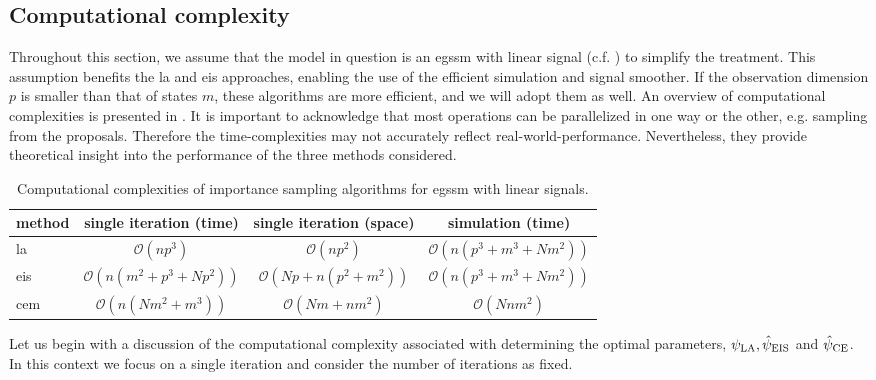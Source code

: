 \subsection{Computational complexity}
Throughout this section, we assume that the model in question is an \gls{egssm} with linear signal (c.f. ) to simplify the treatment. This assumption benefits the \gls{la} and \gls{eis} approaches, enabling the use of the efficient simulation and signal smoother. If the observation dimension $p$ is smaller than that of states $m$, these algorithms are more efficient, and we will adopt them as well.
An overview of computational complexities is presented in . It is important to acknowledge that most operations can be parallelized in one way or the other, e.g. sampling from the proposals. Therefore the time-complexities may not accurately reflect real-world-performance. Nevertheless, they provide theoretical insight into the performance of the three methods considered.

\begin{table}
    \centering
    \begin{tabular}{lccc}
        \toprule 
        method & single iteration (time) & single iteration (space) & simulation (time)\\
        \midrule
        \gls{la} & $\mathcal O (n p^{3})$ & $\mathcal O (np^{2})$ & $\mathcal O(n (p^{3} + m^{3} + Nm^{2}))$ \\
        \gls{eis} & $\mathcal O (n(m^{2} + p^{3} + Np^{2}))$ & $\mathcal O (Np + n(p^{2} + m^{2}))$ & $\mathcal O(n (p^{3} + m^{3} + Nm^{2}))$\\
        \gls{cem} & $\mathcal O (n (Nm^{2} + m^{3}))$& $\mathcal O (Nm + nm^{2})$ & $\mathcal O (Nnm^{2})$\\
        \bottomrule
    \end{tabular}
    \caption{Computational complexities of importance sampling algorithms for \acrshort{egssm} with linear signals.}
    \label{tab:comparison-time-space-complexity}
\end{table}

Let us begin with a discussion of the computational complexity associated with determining the optimal parameters, $\psi_{{\text{LA}}}, \hat\psi_{{\text{EIS}}}$ and $\hat\psi_{{\text{CE}}}$. In this context we focus on a single iteration and consider the number of iterations as fixed.

